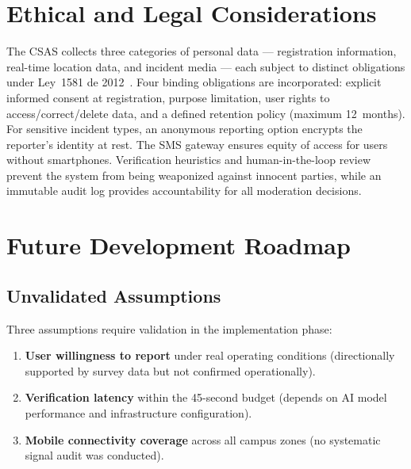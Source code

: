 \documentclass[11pt,a4paper]{article}
\begin{document}
\section{Ethical and Legal Considerations}

The CSAS collects three categories of personal data --- registration information, real-time location data, and incident media --- each subject to distinct obligations under Ley~1581 de 2012~\cite{ley1581}. Four binding obligations are incorporated: explicit informed consent at registration, purpose limitation, user rights to access/correct/delete data, and a defined retention policy (maximum 12~months). For sensitive incident types, an anonymous reporting option encrypts the reporter's identity at rest. The SMS gateway ensures equity of access for users without smartphones. Verification heuristics and human-in-the-loop review prevent the system from being weaponized against innocent parties, while an immutable audit log provides accountability for all moderation decisions.


\section{Future Development Roadmap}

\subsection{Unvalidated Assumptions}

Three assumptions require validation in the implementation phase:

\begin{enumerate}
\item \textbf{User willingness to report} under real operating conditions (directionally supported by survey data but not confirmed operationally).
\item \textbf{Verification latency} within the 45-second budget (depends on AI model performance and infrastructure configuration).
\item \textbf{Mobile connectivity coverage} across all campus zones (no systematic signal audit was conducted).
\end{enumerate}
\end{document}
